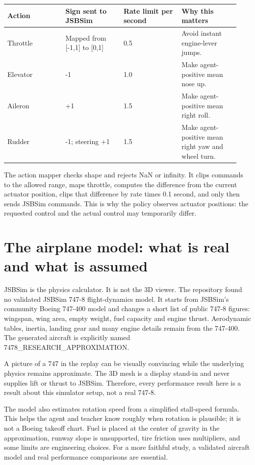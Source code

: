 \documentclass[11pt,a4paper]{article}
\begin{document}
\begin{longtable}{|p{0.235\linewidth}|p{0.235\linewidth}|p{0.235\linewidth}|p{0.235\linewidth}|}\hline
Action & Sign sent to JSBSim & Rate limit per second & Why this matters \\ \hline
Throttle & Mapped from [-1,1] to [0,1] & 0.5 & Avoid instant engine-lever jumps. \\ \hline
Elevator & -1 & 1.0 & Make agent-positive mean nose up. \\ \hline
Aileron & +1 & 1.5 & Make agent-positive mean right roll. \\ \hline
Rudder & -1; steering +1 & 1.5 & Make agent-positive mean right yaw and wheel turn. \\ \hline
\end{longtable}
The action mapper checks shape and rejects NaN or infinity. It clips commands to the allowed range, maps throttle, computes the difference from the current actuator position, clips that difference by rate times 0.1 second, and only then sends JSBSim commands. This is why the policy observes actuator positions: the requested control and the actual control may temporarily differ.

\section{The airplane model: what is real and what is assumed}
JSBSim is the physics calculator. It is not the 3D viewer. The repository found no validated JSBSim 747-8 flight-dynamics model. It starts from JSBSim's community Boeing 747-400 model and changes a short list of public 747-8 figures: wingspan, wing area, empty weight, fuel capacity and engine thrust. Aerodynamic tables, inertia, landing gear and many engine details remain from the 747-400. The generated aircraft is explicitly named 7478\_RESEARCH\_APPROXIMATION.

A picture of a 747 in the replay can be visually convincing while the underlying physics remains approximate. The 3D mesh is a display stand-in and never supplies lift or thrust to JSBSim. Therefore, every performance result here is a result about this simulator setup, not a real 747-8.

The model also estimates rotation speed from a simplified stall-speed formula. This helps the agent and teacher know roughly when rotation is plausible; it is not a Boeing takeoff chart. Fuel is placed at the center of gravity in the approximation, runway slope is unsupported, tire friction uses multipliers, and some limits are engineering choices. For a more faithful study, a validated aircraft model and real performance comparisons are essential.
\end{document}
